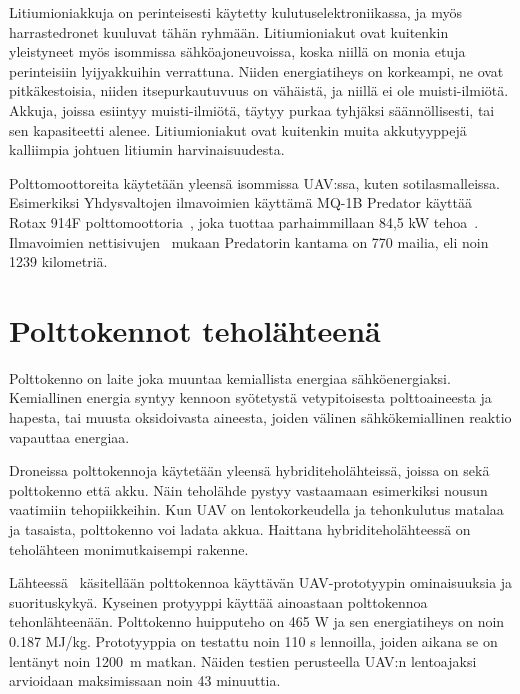 Litiumioniakkuja on perinteisesti käytetty kulutuselektroniikassa, ja myös
harrastedronet kuuluvat tähän ryhmään. Litiumioniakut ovat kuitenkin
yleistyneet myös isommissa sähköajoneuvoissa, koska niillä on monia etuja
perinteisiin lyijyakkuihin verrattuna. Niiden energiatiheys on korkeampi,
ne ovat pitkäkestoisia, niiden itsepurkautuvuus on vähäistä, ja niillä ei ole
muisti-ilmiötä. Akkuja, joissa esiintyy muisti-ilmiötä, täytyy purkaa tyhjäksi
säännöllisesti, tai sen kapasiteetti alenee. Litiumioniakut ovat kuitenkin
muita akkutyyppejä kalliimpia johtuen litiumin
harvinaisuudesta.~\cite{Sparacino2012}

Polttomoottoreita käytetään yleensä isommissa UAV:ssa, kuten sotilasmalleissa.
Esimerkiksi Yhdysvaltojen ilmavoimien käyttämä MQ-1B Predator käyttää Rotax
914F polttomoottoria~\cite{usaf-predator}, joka tuottaa parhaimmillaan
84,5 kW tehoa~\cite{rotax-914}. Ilmavoimien
nettisivujen~\cite{usaf-predator} mukaan Predatorin kantama on 770 mailia, eli
noin 1239 kilometriä.




\section{Polttokennot teholähteenä}
Polttokenno on laite joka muuntaa kemiallista energiaa sähköenergiaksi.
Kemiallinen energia syntyy kennoon syötetystä vetypitoisesta polttoaineesta
ja hapesta, tai muusta oksidoivasta aineesta, joiden välinen sähkökemiallinen
reaktio vapauttaa energiaa.

Droneissa polttokennoja käytetään yleensä hybriditeholähteissä, joissa
on sekä polttokenno että akku. Näin teholähde pystyy vastaamaan esimerkiksi
nousun vaatimiin tehopiikkeihin. Kun UAV on lentokorkeudella ja tehonkulutus
matalaa ja tasaista, polttokenno voi ladata akkua. Haittana
hybriditeholähteessä on teholähteen monimutkaisempi rakenne.~\cite{Gao2005}

Lähteessä~\cite{Bradley2007} käsitellään polttokennoa käyttävän UAV-prototyypin
ominaisuuksia ja suorituskykyä. Kyseinen protyyppi käyttää ainoastaan
polttokennoa tehonlähteenään. Polttokenno huipputeho on 465 W ja sen
energiatiheys on noin 0.187 MJ/kg. Prototyyppia on testattu noin 110 s
lennoilla, joiden aikana se on lentänyt noin 1200~m matkan.  Näiden testien
perusteella UAV:n lentoajaksi arvioidaan maksimissaan noin 43 minuuttia.


